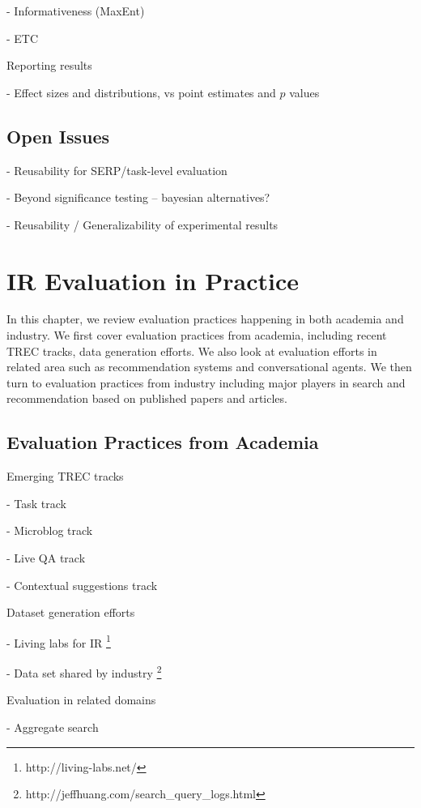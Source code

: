 \documentclass[openany]{now} %
\newcommand{\newpar}{\bigskip\noindent}
\begin{document}
- Informativeness (MaxEnt) \cite{AslamYP05}

- ETC \cite{Bron:2013} \cite{Boytsov:2013}  \cite{Robertson:2012}

\newpar
Reporting results

- Effect sizes and distributions, vs point estimates and $p$ values

\section{Open Issues}

- Reusability for SERP/task-level evaluation

- Beyond significance testing -- bayesian alternatives?

- Reusability / Generalizability of experimental results


\chapter{IR Evaluation in Practice}
\label{c-practice}

In this chapter, we review evaluation practices happening in both academia and industry. We first cover evaluation practices from academia, including recent TREC tracks, data generation efforts. We also look at evaluation efforts in related area such as recommendation systems and conversational agents. We then turn to evaluation practices from industry including major players in search and recommendation based on published papers and articles.

\section{Evaluation Practices from Academia}

Emerging TREC tracks

- Task track

- Microblog track

- Live QA track

- Contextual suggestions track

\newpar
Dataset generation efforts

- Living labs for IR \footnote{http://living-labs.net/}

- Data set shared by industry \footnote{http://jeffhuang.com/search\_query\_logs.html}

\newpar
Evaluation in related domains

- Aggregate search \cite{Zhou:2013}
\end{document}
